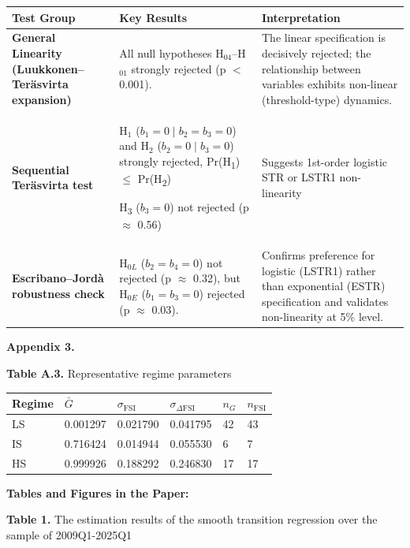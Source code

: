 \documentclass[12pt,preprint,aps,author-year]{revtex4-1}
\begin{document}
\begin{tabular}{|l|l|l|}
\hline
\textbf{Test Group} & \textbf{Key Results} & \textbf{Interpretation} \\ \hline
\textbf{General Linearity (Luukkonen–Teräsvirta expansion)} & All null hypotheses H$_{04}$–H$_{01}$ strongly rejected (p $<$ 0.001). & The linear specification is decisively rejected; the relationship between variables exhibits non-linear (threshold-type) dynamics. \\ \hline
\textbf{Sequential Teräsvirta test} & H$_1$ ($b_1 = 0 \mid b_2 = b_3 = 0$) and H$_2$ ($b_2 = 0 \mid b_3 = 0$) strongly rejected, Pr(H\textsubscript{1}) $\le$ Pr(H\textsubscript{2})

H\textsubscript{3} ($b_3 = 0$) not rejected (p $\approx$ 0.56) & Suggests 1st-order logistic STR or LSTR1 non-linearity \\ \hline
\textbf{Escribano–Jordà robustness check} & H$_{0L}$ ($b_2 = b_4 = 0$) not rejected (p $\approx$ 0.32), but H$_{0E}$ ($b_1 = b_3 = 0$) rejected (p $\approx$ 0.03). & Confirms preference for logistic (LSTR1) rather than exponential (ESTR) specification and validates non-linearity at 5\% level. \\ \hline
\end{tabular}
\newpage

\textbf{Appendix 3. }

\textbf{Table A.3. }Representative regime parameters

\begin{tabular}{|l|l|l|l|l|l|}
\hline
Regime & $\bar{G}$ & $\sigma_{\text{FSI}}$ & $\sigma_{\Delta \text{FSI}}$ & $n_G$ & $n_{\text{FSI}}$ \\ \hline
LS & 0.001297 & 0.021790 & 0.041795 & 42 & 43 \\ \hline
IS & 0.716424 & 0.014944 & 0.055530 & 6 & 7 \\ \hline
HS & 0.999926 & 0.188292 & 0.246830 & 17 & 17 \\ \hline
\end{tabular}
\newpage

\textbf{Tables and Figures in the Paper:}

\textbf{Table 1.} The estimation results of the smooth transition regression over the sample of 2009Q1-2025Q1
\end{document}
